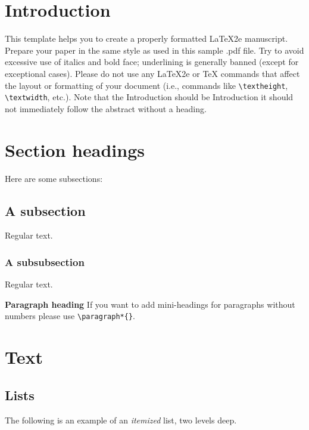 \documentclass[qe,nameyear,final,openaccess]{econsocart}
\theoremstyle{plain}
\begin{document}
\section{Introduction}\label{s1}

This template helps you to create a properly formatted LaTeX2e manuscript.
Prepare your paper in the same style as used in this sample .pdf file.
Try to avoid excessive use of italics and bold face; underlining is generally banned (except for exceptional cases). Please do not use any LaTeX2e or TeX commands that affect the layout or formatting of your document (i.e., commands like \texttt{{\textbackslash}textheight}, \texttt{{\textbackslash}textwidth}, etc.). Note that the Introduction should be Introduction it should not immediately follow the abstract without a heading.

\section{Section headings}

Here are some subsections:

\subsection{A subsection}

Regular text.

\subsubsection{A subsubsection}

Regular text.

\textbf{Paragraph heading}
If you want to add mini-headings for paragraphs without numbers please use \texttt{{\textbackslash}paragraph*\{\}}.

\section{Text}

\subsection{Lists}

The following is an example of an \textit{itemized} list,
two levels deep.
\end{document}
